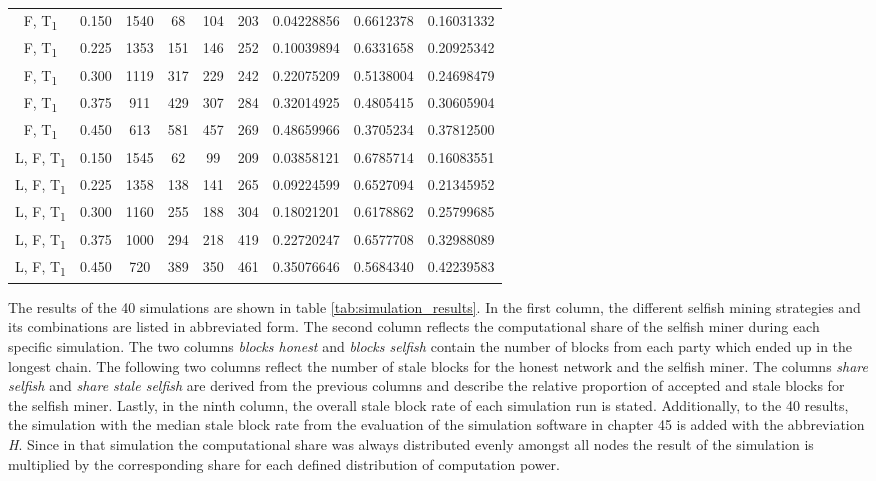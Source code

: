 {\begin{landscape}
\begin{tabular}{ccccccccc}
            F, T\textsubscript{1} & 0.150 & 1540 & 68 & 104 & 203 & 0.04228856 & 0.6612378 & 0.16031332 \\
            F, T\textsubscript{1} & 0.225 & 1353 & 151 & 146 & 252 & 0.10039894 & 0.6331658 & 0.20925342 \\
            F, T\textsubscript{1} & 0.300 & 1119 & 317 & 229 & 242 & 0.22075209 & 0.5138004 & 0.24698479 \\
            F, T\textsubscript{1} & 0.375 & 911 & 429 & 307 & 284 & 0.32014925 & 0.4805415 & 0.30605904 \\
            F, T\textsubscript{1} & 0.450 & 613 & 581 & 457 & 269 & 0.48659966 & 0.3705234 & 0.37812500 \\
            L, F, T\textsubscript{1} & 0.150 & 1545 & 62 & 99 & 209 & 0.03858121 & 0.6785714 & 0.16083551 \\
            L, F, T\textsubscript{1} & 0.225 & 1358 & 138 & 141 & 265 & 0.09224599 & 0.6527094 & 0.21345952 \\
            L, F, T\textsubscript{1} & 0.300 & 1160 & 255 & 188 & 304 & 0.18021201 & 0.6178862 & 0.25799685 \\
            L, F, T\textsubscript{1} & 0.375 & 1000 & 294 & 218 & 419 & 0.22720247 & 0.6577708 & 0.32988089 \\
            L, F, T\textsubscript{1} & 0.450 & 720 & 389 & 350 & 461 & 0.35076646 & 0.5684340 & 0.42239583 \\
    		\bottomrule
  		\end{tabular}
  		\label{tab:simulation_results}
	\end{landscape}
}

The results of the 40 simulations are shown in table \ref{tab:simulation_results}.
In the first column, the different selfish mining strategies and its combinations are listed in abbreviated form.
The second column reflects the  computational share of the selfish miner during each specific simulation.
The two columns \textit{blocks honest} and \textit{blocks selfish} contain the number of blocks from each party which ended up in the longest chain.
The following two columns reflect the number of stale blocks for the honest network and the selfish miner.
The columns \textit{share selfish} and \textit{share stale selfish} are derived from the previous columns and describe the relative proportion of accepted and stale blocks for the selfish miner.
Lastly, in the ninth column, the overall stale block rate of each simulation run is stated.
Additionally, to the 40 results, the simulation with the median stale block rate from the evaluation of the simulation software in chapter 45 is added with the abbreviation \textit{H}.
Since in that simulation the computational share was always distributed evenly amongst all nodes the result of the simulation is multiplied by the corresponding share for each defined distribution of computation power.

